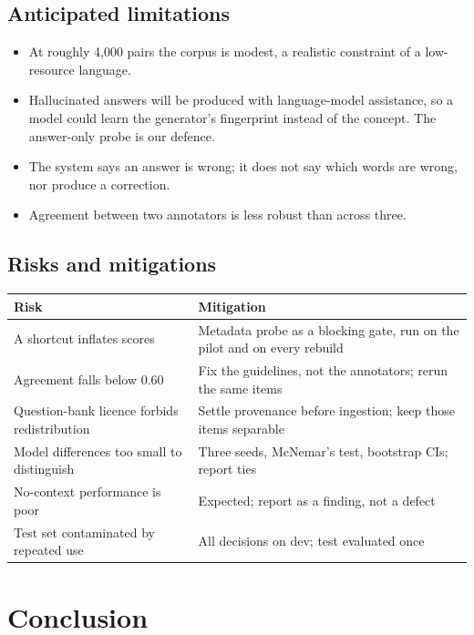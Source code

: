 \documentclass[12pt,a4paper]{article}
\begin{document}
\subsection{Anticipated limitations}

\begin{itemize}[leftmargin=*,itemsep=2pt]
  \item At roughly 4{,}000 pairs the corpus is modest, a realistic constraint of
  a low-resource language.
  \item Hallucinated answers will be produced with language-model assistance, so
  a model could learn the generator's fingerprint instead of the concept. The
  answer-only probe is our defence.
  \item The system says an answer is wrong; it does not say which words are
  wrong, nor produce a correction.
  \item Agreement between two annotators is less robust than across three.
\end{itemize}

\subsection{Risks and mitigations}

\begin{center}
\begin{tabular}{L{5.0cm} L{8.6cm}}
\toprule
\textbf{Risk} & \textbf{Mitigation} \\
\midrule
A shortcut inflates scores & Metadata probe as a blocking gate, run on the pilot
and on every rebuild \\
Agreement falls below 0.60 & Fix the guidelines, not the annotators; rerun the
same items \\
Question-bank licence forbids redistribution & Settle provenance before
ingestion; keep those items separable \\
Model differences too small to distinguish & Three seeds, McNemar's test,
bootstrap CIs; report ties \\
No-context performance is poor & Expected; report as a finding, not a defect \\
Test set contaminated by repeated use & All decisions on dev; test evaluated once \\
\bottomrule
\end{tabular}
\end{center}

\section{Conclusion}
\end{document}
